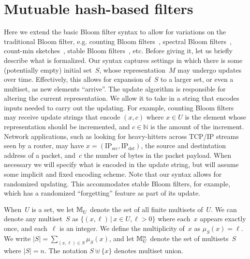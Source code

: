 \section{Mutuable hash-based filters}
Here we extend the basic Bloom filter syntax to allow for variations on the traditional Bloom filter, e.g. counting Bloom filters~\cite{xxx}, spectral Bloom filters~\cite{xxx}, count-min sketches~\cite{xxx}, stable Bloom filters~\cite{xxx}, etc.   Before giving it, let us briefly describe what is formalized.  Our syntax captures settings in which there is some (potentially empty) initial set~$S$, whose representation~$M$ may undergo updates over time.  Effectively, this allows for expansion of~$S$ to a larger set, or even a multiset, as new elements ``arrive''.    The update algorithm is responsible for altering the current representation.  We allow it to take in a string that encodes inputs needed to carry out the updating.  For example, counting Bloom filters may receive update strings that encode $(x,c)$ where $x \in U$ is the element whose representation should be incremented, and $c \in \mathbb{N}$ is the amount of the increment.  Network applications, such as looking for heavy-hitters across TCP/IP streams seen by a router, may have $x = (\mathrm{IP_{src}},\mathrm{IP_{dst}})$, the source and destintation address of a packet, and~$c$ the number of bytes in the packet payload.  When necessary we will specify what is encoded in the update string, but will assume some implicit and fixed encoding scheme.  Note that our syntax allows for randomized updating.  This accommodates stable Bloom filters, for example, which has a randomized ``forgetting'' feature as part of its update.

When~$U$ is a set, we let $\mathbb{M}_{U}^{}$ denote the set of all finite multisets of~$U$.  We can denote any multiset~$S$ as $\{(x,\ell) \,|\, x \in U, \ell > 0\}$ where each~$x$ appears exactly once, and each~$\ell$ is an integer.  We define the multiplicity of~$x$ as $\mu_S(x) = \ell$.  We write $|S|= \sum_{(x,\ell)\in S}\mu_S(x)$, and let $\mathbb{M}_{U}^{n}$ denote the set of multisets~$S$ where $|S|=n$.   The notation $S \uplus \{x\}$ denotes multiset union.

